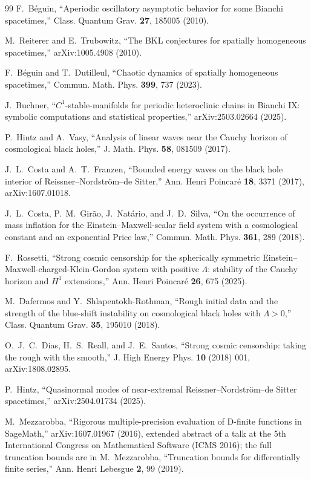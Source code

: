 \documentclass[11pt,letterpaper]{article}
\begin{document}
\begin{thebibliography}{99}
 F.~B\'eguin, ``Aperiodic oscillatory asymptotic behavior for some Bianchi spacetimes,'' Class. Quantum Grav. \textbf{27}, 185005 (2010).

 M.~Reiterer and E.~Trubowitz, ``The BKL conjectures for spatially homogeneous spacetimes,'' arXiv:1005.4908 (2010).

 F.~B\'eguin and T.~Dutilleul, ``Chaotic dynamics of spatially homogeneous spacetimes,'' Commun. Math. Phys. \textbf{399}, 737 (2023).

 J.~Buchner, ``$C^1$-stable-manifolds for periodic heteroclinic chains in Bianchi IX: symbolic computations and statistical properties,'' arXiv:2503.02664 (2025).

 P.~Hintz and A.~Vasy, ``Analysis of linear waves near the Cauchy horizon of cosmological black holes,'' J. Math. Phys. \textbf{58}, 081509 (2017).

 J.~L.~Costa and A.~T.~Franzen, ``Bounded energy waves on the black hole interior of Reissner--Nordstr\"om--de Sitter,'' Ann. Henri Poincar\'e \textbf{18}, 3371 (2017), arXiv:1607.01018.

 J.~L.~Costa, P.~M.~Gir\~ao, J.~Nat\'ario, and J.~D.~Silva, ``On the occurrence of mass inflation for the Einstein--Maxwell-scalar field system with a cosmological constant and an exponential Price law,'' Commun. Math. Phys. \textbf{361}, 289 (2018).

 F.~Rossetti, ``Strong cosmic censorship for the spherically symmetric Einstein--Maxwell-charged-Klein-Gordon system with positive $\Lambda$: stability of the Cauchy horizon and $H^1$ extensions,'' Ann. Henri Poincar\'e \textbf{26}, 675 (2025).

 M.~Dafermos and Y.~Shlapentokh-Rothman, ``Rough initial data and the strength of the blue-shift instability on cosmological black holes with $\Lambda>0$,'' Class. Quantum Grav. \textbf{35}, 195010 (2018).

 O.~J.~C.~Dias, H.~S.~Reall, and J.~E.~Santos, ``Strong cosmic censorship: taking the rough with the smooth,'' J. High Energy Phys. \textbf{10} (2018) 001, arXiv:1808.02895.

 P.~Hintz, ``Quasinormal modes of near-extremal Reissner--Nordstr\"om--de Sitter spacetimes,'' arXiv:2504.01734 (2025).

 M.~Mezzarobba, ``Rigorous multiple-precision evaluation of D-finite functions in SageMath,'' arXiv:1607.01967 (2016), extended abstract of a talk at the 5th International Congress on Mathematical Software (ICMS 2016); the full truncation bounds are in M.~Mezzarobba, ``Truncation bounds for differentially finite series,'' Ann. Henri Lebesgue \textbf{2}, 99 (2019).


\end{thebibliography}
\end{document}

